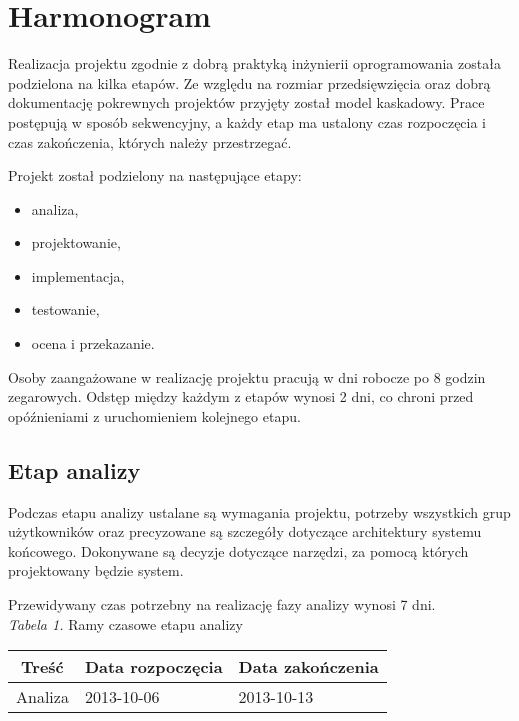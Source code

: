 \documentclass 	[11pt, a4paper, leqno]	{article}					%
\begin{document}
\section{Harmonogram}
\noindent
Realizacja projektu zgodnie z dobrą praktyką inżynierii oprogramowania została podzielona na kilka etapów. Ze względu na rozmiar przedsięwzięcia oraz dobrą dokumentację pokrewnych projektów przyjęty został model kaskadowy. Prace postępują w sposób sekwencyjny, a każdy etap ma ustalony czas rozpoczęcia i czas zakończenia, których należy przestrzegać.

Projekt został podzielony na następujące etapy:
\begin{itemize}
	\item analiza,
	\item projektowanie,
	\item implementacja,
	\item testowanie,
	\item ocena i przekazanie.
\end{itemize}

Osoby zaangażowane w realizację projektu pracują w dni robocze po 8 godzin zegarowych. Odstęp między każdym z etapów wynosi 2 dni, co chroni przed opóźnieniami z uruchomieniem kolejnego etapu.

\subsection{Etap analizy}
\noindent
Podczas etapu analizy ustalane są wymagania projektu, potrzeby wszystkich grup użytkowników oraz precyzowane są szczegóły dotyczące architektury systemu końcowego. Dokonywane są decyzje dotyczące narzędzi, za pomocą których projektowany będzie system. 

Przewidywany czas potrzebny na realizację fazy analizy wynosi 7 dni. \\


\textit{Tabela 1.} Ramy czasowe etapu analizy

\begin{center}
	\begin{tabular}{| l | l | l |}
		\hline
		\multicolumn{1}{|c|}{Treść} & 
		\multicolumn{1}{|c|}{Data rozpoczęcia} & 
		\multicolumn{1}{|c|}{Data zakończenia} \\ \hline \hline
		Analiza & 2013-10-06 & 2013-10-13 \\ \hline
	\end{tabular}
\end{center}
\end{document}
